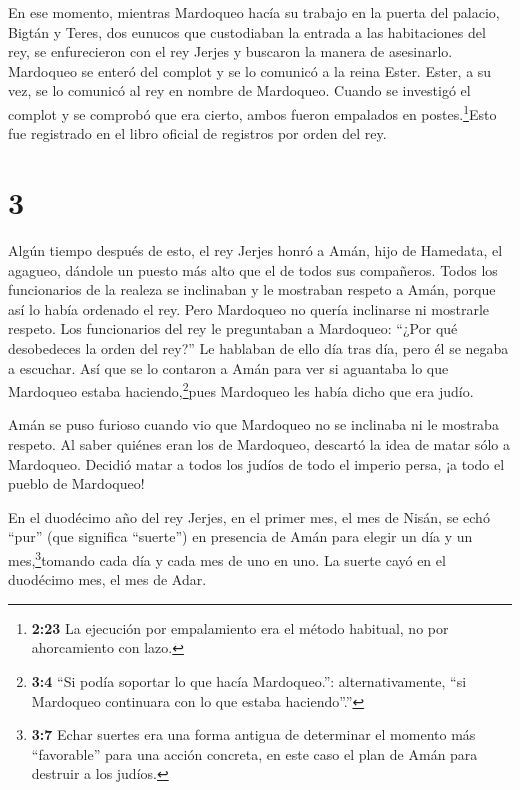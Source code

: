  En ese momento, mientras Mardoqueo hacía su trabajo en la
puerta del palacio, Bigtán y Teres, dos eunucos que custodiaban la
entrada a las habitaciones del rey, se enfurecieron con el rey Jerjes y
buscaron la manera de asesinarlo.  Mardoqueo se enteró del
complot y se lo comunicó a la reina Ester. Ester, a su vez, se lo
comunicó al rey en nombre de Mardoqueo.  Cuando se
investigó el complot y se comprobó que era cierto, ambos fueron
empalados en postes.\footnote{\textbf{2:23} La ejecución por
  empalamiento era el método habitual, no por ahorcamiento con lazo.}Esto
fue registrado en el libro oficial de registros por orden del rey.

\hypertarget{section-2}{%
\section{3}\label{section-2}}

 Algún tiempo después de esto, el rey Jerjes honró a Amán,
hijo de Hamedata, el agagueo, dándole un puesto más alto que el de todos
sus compañeros.  Todos los funcionarios de la realeza se
inclinaban y le mostraban respeto a Amán, porque así lo había ordenado
el rey. Pero Mardoqueo no quería inclinarse ni mostrarle respeto.
 Los funcionarios del rey le preguntaban a Mardoqueo: ``¿Por
qué desobedeces la orden del rey?''  Le hablaban de ello día
tras día, pero él se negaba a escuchar. Así que se lo contaron a Amán
para ver si aguantaba lo que Mardoqueo estaba haciendo,\footnote{\textbf{3:4}
  ``Si podía soportar lo que hacía Mardoqueo.'': alternativamente, ``si
  Mardoqueo continuara con lo que estaba haciendo''.''}pues Mardoqueo
les había dicho que era judío.

 Amán se puso furioso cuando vio que Mardoqueo no se
inclinaba ni le mostraba respeto.  Al saber quiénes eran los
de Mardoqueo, descartó la idea de matar sólo a Mardoqueo. Decidió matar
a todos los judíos de todo el imperio persa, ¡a todo el pueblo de
Mardoqueo!

 En el duodécimo año del rey Jerjes, en el primer mes, el
mes de Nisán, se echó ``pur'' (que significa ``suerte'') en presencia de
Amán para elegir un día y un mes,\footnote{\textbf{3:7} Echar suertes
  era una forma antigua de determinar el momento más ``favorable'' para
  una acción concreta, en este caso el plan de Amán para destruir a los
  judíos.}tomando cada día y cada mes de uno en uno. La suerte cayó en
el duodécimo mes, el mes de Adar.

